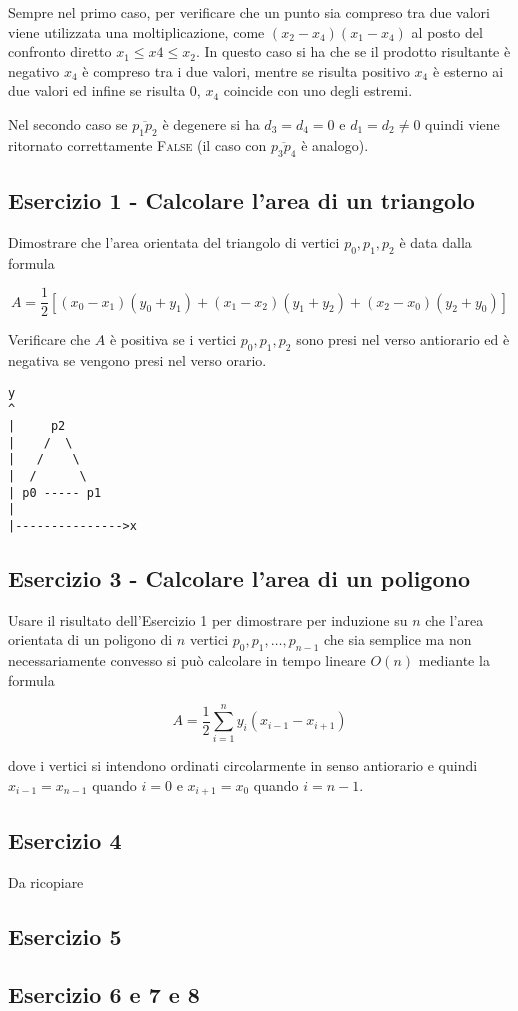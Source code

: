 Sempre nel primo caso, per verificare che un punto sia compreso tra due valori viene utilizzata una moltiplicazione, come $(x_2 - x_4)(x_1 - x_4)$ al posto del confronto diretto $x_1 \leq x4 \leq x_2$. In questo caso si ha che se il prodotto risultante è negativo $x_4$ è compreso tra i due valori, mentre se risulta positivo $x_4$ è esterno ai due valori ed infine se risulta 0, $x_4$ coincide con uno degli estremi.

Nel secondo caso se $\overline{p_1p_2}$ è degenere si ha $d_3=d_4=0$ e $d_1=d_2\neq 0$ quindi viene ritornato correttamente \textsc{False} (il caso con $\overline{p_3p_4}$ è analogo).

\subsection{Esercizio 1 - Calcolare l'area di un triangolo}\label{esercizio-1---calcolare-larea-di-un-triangolo}

Dimostrare che l'area orientata del triangolo di vertici $p_0, p_1, p_2$ è data dalla formula

$$
A = \frac{1}{2}[(x_0 -x_1)(y_0 +y_1)+(x_1 -x_2)(y_1 +y_2)+(x_2 -x_0)(y_2 +y_0)]
$$

Verificare che $A$ è positiva se i vertici $p_0, p_1, p_2$ sono presi nel verso antiorario ed è negativa se vengono presi nel verso orario.

\begin{verbatim}
y
^
|     p2
|    /  \
|   /    \
|  /      \ 
| p0 ----- p1
|
|--------------->x
\end{verbatim}

\subsection{Esercizio 3 - Calcolare l'area di un poligono}\label{esercizio-3---calcolare-larea-di-un-poligono}

Usare il risultato dell'Esercizio 1 per dimostrare per induzione su $n$ che l'area orientata di un poligono di $n$ vertici $p_0, p_1, \ldots , p_{n-1}$ che sia semplice ma non necessariamente convesso si può calcolare in tempo lineare $O(n)$ mediante la formula

$$
A = \frac{1}{2} \sum\limits_{i=1}^{n} y_i(x_{i-1} -x_{i+1})
$$

dove i vertici si intendono ordinati circolarmente in senso antiorario e
quindi $x_{i-1} = x_{n-1}$ quando $i=0$ e $x_{i+1}=x_0$ quando $i=n-1$.

\subsection{Esercizio 4}\label{esercizio-4}

Da ricopiare

\subsection{Esercizio 5}\label{esercizio-5}

\subsection{Esercizio 6 e 7 e 8}\label{esercizio-6-e-7-e-8}
